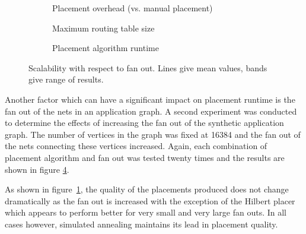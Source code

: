 				\begin{figure}
					\center
					\begin{subfigure}{\linewidth}
						\center
						
						\caption{Placement overhead (vs. manual placement)}
						\label{fig:placement-scalability-fanout-quality}
					\end{subfigure}
					
					\vspace*{1em}
					
					\begin{subfigure}{\linewidth}
						\center
						
						\caption{Maximum routing table size}
						\label{fig:placement-scalability-fanout-entries}
					\end{subfigure}
					
					\vspace*{1em}
					
					\begin{subfigure}{\linewidth}
						\center
						
						\caption{Placement algorithm runtime}
						\label{fig:placement-scalability-fanout-runtime}
					\end{subfigure}
					
						\caption{Scalability with respect to fan out. Lines give mean values,
						bands give range of results.}
					\label{fig:placement-scalability-fanout}
				\end{figure}
				
				Another factor which can have a significant impact on placement runtime
				is the fan out of the nets in an application graph. A second experiment
				was conducted to determine the effects of increasing the fan out of the
				synthetic application graph. The number of vertices in the graph was
				fixed at \num{16384} and the fan out of the nets connecting these
				vertices increased. Again, each combination of placement algorithm and
				fan out was tested twenty times and the results are shown in figure
				\ref{fig:placement-scalability-fanout}.
				
				As shown in figure~\ref{fig:placement-scalability-fanout-quality}, the
				quality of the placements produced does not change dramatically as the
				fan out is increased with the exception of the Hilbert placer which
				appears to perform better for very small and very large fan outs. In
				all cases however, simulated annealing maintains its lead in placement
				quality.
				

